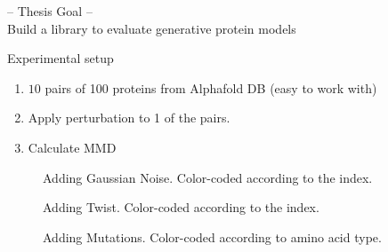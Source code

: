 \documentclass[aspectratio=169, 10pt, dvipsnames]{beamer}
\begin{document}
\begin{frame}[standout]
  -- Thesis Goal -- \\
  Build a library to evaluate generative protein models
\end{frame}

{
  \begin{frame}[fragile]{Experimental setup}
    \begin{enumerate}
    \item $10$ pairs of 100 proteins from Alphafold DB (easy to work
      with)
    \item Apply perturbation to 1 of the pairs.
    \item Calculate MMD
    \end{enumerate}

  \begin{minipage}{0.3\textwidth}
    \begin{figure}
      \centering

      \caption{Adding Gaussian Noise. Color-coded according to the index.}
      \label{fig:gaussian}
    \end{figure}
  \end{minipage}
  \hfill
  \begin{minipage}{0.3\textwidth}
    \begin{figure}
      \centering
      \caption{Adding Twist. Color-coded according to the index.}
      \label{fig:twist}
    \end{figure}
  \end{minipage}
  \hfill
  \begin{minipage}{0.3\textwidth}
    \begin{figure}
      \centering
      \caption{Adding Mutations. Color-coded according to amino acid type.}
      \label{fig:mutation}
    \end{figure}
  \end{minipage}
\end{frame}
}
\end{document}
